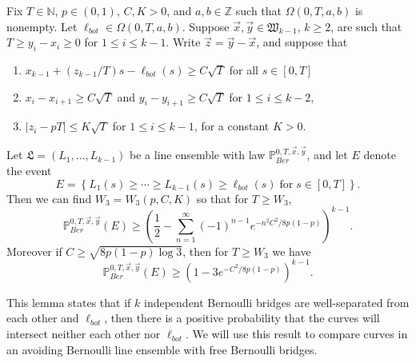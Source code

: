 \begin{lemma}\label{CurveSeparation} Fix $T\in\mathbb{N}$, $p\in (0,1)$, $C,K>0$, and $a,b\in \mathbb{Z}$ such that $\Omega(0,T,a,b)$ is nonempty. Let $\ell_{bot} \in \Omega(0,T,a,b)$. Suppose $\vec{x},\vec{y}\in\mathfrak{W}_{k-1}$, $k\geq 2$, are such that $T \geq y_i - x_i \geq 0$ for $1\leq i\leq k-1$. Write $\vec{z} = \vec{y} - \vec{x}$, and suppose that
	\begin{enumerate}[label=(\arabic*)]
		
		\item $x_{k-1} + (z_{k-1}/T)s - \ell_{bot}(s) \geq C\sqrt{T}$ for all $s\in[0,T]$
		
		\item $x_i - x_{i+1} \geq C\sqrt{T}$ and $y_i - y_{i+1} \geq C\sqrt{T}$ for $1\leq i\leq k-2$,
		
		\item $|z_i - pT| \leq K\sqrt{T}$ for $1\leq i\leq k-1$, for a constant $K > 0$.
		
	\end{enumerate}
	Let $\mathfrak{L} = (L_1,\dots,L_{k-1})$ be a line ensemble with law $\mathbb{P}^{0,T,\vec{x},\vec{y}}_{Ber}$, and let $E$ denote the event 
	\[ E=\left\{L_1(s)\geq \cdots \geq L_{k-1}(s)\geq \ell_{bot}(s) \; \mathrm{for} \; s\in [0,T]\right\}.
	\] 
	Then we can find $W_3 = W_3(p,C,K)$ so that for $T\geq W_3$,
	\begin{equation}\label{SepBound1}
	\mathbb{P}^{0,T,\vec{x},\vec{y}}_{Ber}(E) \geq \left(\frac{1}{2} - \sum_{n=1}^\infty (-1)^{n-1} e^{-n^2C^2/8p(1-p)}\right)^{k-1}.
	\end{equation}
	Moreover if $C \geq \sqrt{8p(1-p)\log 3}$, then for $T\geq W_3$ we have
	\begin{equation}\label{SepBound2}
	\mathbb{P}^{0,T,\vec{x},\vec{y}}_{Ber}(E) \geq \left(1 - 3e^{-C^2/8p(1-p)}\right)^{k-1}.
	\end{equation}
\end{lemma}

\begin{remark}
	This lemma states that if $k$ independent Bernoulli bridges are well-separated from each other and $\ell_{bot}$, then there is a positive probability that the curves will intersect neither each other nor $\ell_{bot}$. We will use this result to compare curves in an avoiding Bernoulli line ensemble with free Bernoulli bridges.
\end{remark}


